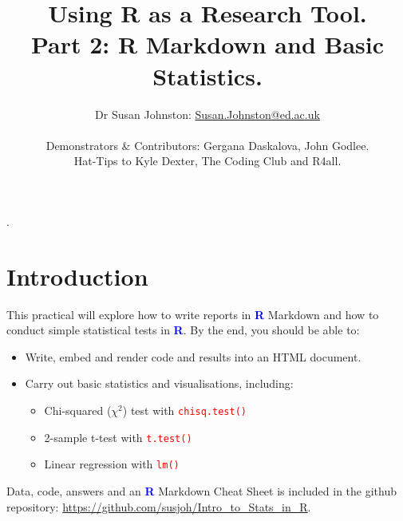 \documentclass[a4paper,12pt]{article}
\newcommand\boldblue[1]{\textcolor{blue}{\textbf{#1}}}
\newcommand\code[1]{\textcolor{red}{\texttt{#1}}}
\begin{document}





\title{Using R as a Research Tool.\\
Part 2: R Markdown and Basic Statistics.}
\author{Dr Susan Johnston: \href{mailto:Susan.Johnston@ed.ac.uk}{Susan.Johnston@ed.ac.uk}  \\ \\
Demonstrators \& Contributors: Gergana Daskalova, John Godlee. \\
Hat-Tips to Kyle Dexter, The Coding Club and R4all.}
\date{}






\maketitle


\vspace*{-2.5cm}.
\section {Introduction}

This practical will explore how to write reports in \boldblue{R} Markdown and how to conduct simple statistical tests in \boldblue{R}. By the end, you should be able to:

\begin{itemize}

\item Write, embed and render code and results into an HTML document.

\item Carry out basic statistics and visualisations, including:

\begin{itemize}

\item Chi-squared ($\chi^{2}$) test with \code{chisq.test()}
\item 2-sample t-test with \code{t.test()}
\item Linear regression with \code{lm()}


\end{itemize}

\end{itemize}
Data, code, answers and an \boldblue{R} Markdown Cheat Sheet is included in the github repository: \url{https://github.com/susjoh/Intro_to_Stats_in_R}.
\end{document}
